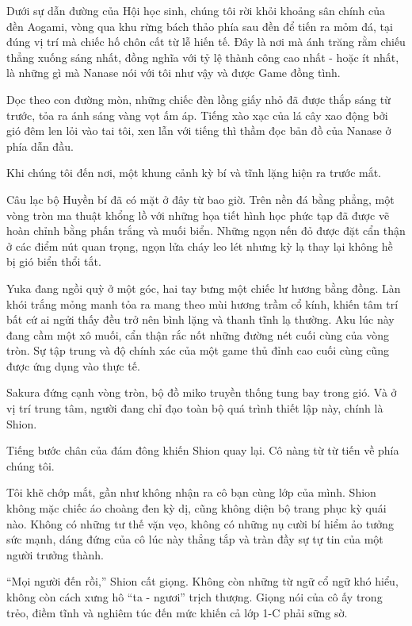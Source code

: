 \documentclass[../main.tex]{subfiles}
\begin{document}
Dưới sự dẫn đường của Hội học sinh, chúng tôi rời khỏi khoảng sân chính của đền Aogami, vòng qua khu rừng bách thảo phía sau đền để tiến ra mỏm đá, tại đúng vị trí mà chiếc hố chôn cất từ lễ hiến tế. Đây là nơi mà ánh trăng rằm chiếu thẳng xuống sáng nhất, đồng nghĩa với tỷ lệ thành công cao nhất - hoặc ít nhất, là những gì mà Nanase nói với tôi như vậy và được Game đồng tình.

Dọc theo con đường mòn, những chiếc đèn lồng giấy nhỏ đã được thắp sáng từ trước, tỏa ra ánh sáng vàng vọt ấm áp. Tiếng xào xạc của lá cây xao động bởi gió đêm len lỏi vào tai tôi, xen lẫn với tiếng thì thầm đọc bản đồ của Nanase ở phía dẫn đầu.

Khi chúng tôi đến nơi, một khung cảnh kỳ bí và tĩnh lặng hiện ra trước mắt.

Câu lạc bộ Huyền bí đã có mặt ở đây từ bao giờ. Trên nền đá bằng phẳng, một vòng tròn ma thuật khổng lồ với những họa tiết hình học phức tạp đã được vẽ hoàn chỉnh bằng phấn trắng và muối biển. Những ngọn nến đỏ được đặt cẩn thận ở các điểm nút quan trọng, ngọn lửa cháy leo lét nhưng kỳ lạ thay lại không hề bị gió biển thổi tắt.

Yuka đang ngồi quỳ ở một góc, hai tay bưng một chiếc lư hương bằng đồng. Làn khói trắng mỏng manh tỏa ra mang theo mùi hương trầm cổ kính, khiến tâm trí bất cứ ai ngửi thấy đều trở nên bình lặng và thanh tĩnh lạ thường. Aku lúc này đang cầm một xô muối, cẩn thận rắc nốt những đường nét cuối cùng của vòng tròn. Sự tập trung và độ chính xác của một game thủ đỉnh cao cuối cùng cũng được ứng dụng vào thực tế.

Sakura đứng cạnh vòng tròn, bộ đồ miko truyền thống tung bay trong gió. Và ở vị trí trung tâm, người đang chỉ đạo toàn bộ quá trình thiết lập này, chính là Shion.

Tiếng bước chân của đám đông khiến Shion quay lại. Cô nàng từ từ tiến về phía chúng tôi.

Tôi khẽ chớp mắt, gần như không nhận ra cô bạn cùng lớp của mình. Shion không mặc chiếc áo choàng đen kỳ dị, cũng không diện bộ trang phục kỳ quái nào. Không có những tư thế vặn vẹo, không có những nụ cười bí hiểm ảo tưởng sức mạnh, dáng đứng của cô lúc này thẳng tắp và tràn đầy sự tự tin của một người trưởng thành.

``Mọi người đến rồi,'' Shion cất giọng. Không còn những từ ngữ cổ ngữ khó hiểu, không còn cách xưng hô ``ta - ngươi'' trịch thượng. Giọng nói của cô ấy trong trẻo, điềm tĩnh và nghiêm túc đến mức khiến cả lớp 1-C phải sững sờ.
\end{document}
